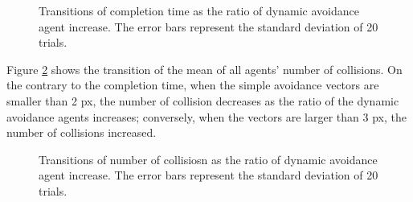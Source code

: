 \documentclass[letterpaper, 10 pt, conference]{ieeeconf}  %
\begin{document}
\begin{figure}[thpb]
   \centering
   \caption{Transitions of completion time as the ratio of dynamic avoidance agent increase. The error bars represent the standard deviation of 20 trials.}
   \label{fig:result_time}
\end{figure}

Figure \ref{fig:result_collisions} shows the transition of the mean of all agents' number of collisions. On the contrary to the completion time, when the simple avoidance vectors are smaller than 2 px, the number of collision decreases as the ratio of the dynamic avoidance agents increases; conversely, when the vectors are larger than 3 px, the number of collisions increased. 

\begin{figure}[thpb]
   \centering
   \caption{Transitions of number of collisiosn as the ratio of dynamic avoidance agent increase. The error bars represent the standard deviation of 20 trials.}
   \label{fig:result_collisions}
\end{figure}
\end{document}
